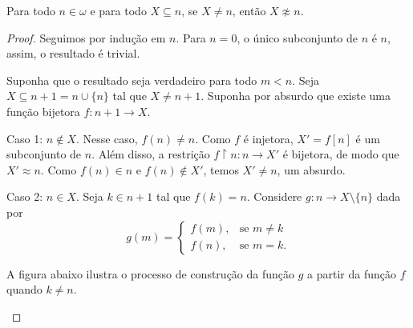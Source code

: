\begin{lemma}[$Z^--P$]\label{lem:subconjuntoProprioDeNaturalNaoEquipotente}
    Para todo $n \in \omega$ e para todo $X\subseteq n$, se $X\neq n$, então $X\not\approx n$.
\end{lemma}
\begin{proof}
    Seguimos por indução em $n$.
    Para $n=0$, o único subconjunto de $n$ é $n$, assim, o resultado é trivial.

    Suponha que o resultado seja verdadeiro para todo $m<n$.
    Seja $X\subseteq n+1=n\cup\{n\}$ tal que $X\neq n+1$.
    Suponha por absurdo que existe uma função bijetora $f: n+1\to X$.

    Caso 1: $n\notin X$.
    Nesse caso, $f(n)\neq n$.
    Como $f$ é injetora, $X'=f[n]$ é um subconjunto de $n$.
    Além disso, a restrição $f\restriction n:n\to X'$ é bijetora, de modo que $X'\approx n$.
    Como $f(n)\in n$ e $f(n)\notin X'$, temos $X'\neq n$, um absurdo.

    Caso 2: $n\in X$.
    Seja $k\in n+1$ tal que $f(k)=n$.
    Considere $g:n\to X\setminus \{n\}$ dada por
     \[
         g(m) = \begin{cases}
             f(m), & \text{se } m\neq k\\
             f(n), & \text{se } m=k.
         \end{cases}
     \]

     A figura abaixo ilustra o processo de construção da função $g$ a partir da função $f$ quando $k\neq n$.

     \begin{center}
\end{center}
\end{proof}
